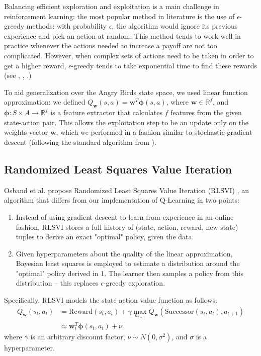 \documentclass[fleqn,10pt]{SelfArx} %
\begin{document}
Balancing efficient exploration and exploitation is a main challenge in reinforcement learning: the most popular method in literature is the use of $\epsilon$-greedy methods: with probability $\epsilon$, the algorithm would ignore its previous experience and pick an action at random. This method tends to work well in practice whenever the actions needed to increase a payoff are not too complicated. However, when complex sets of actions need to be taken in order to get a higher reward, $\epsilon$-greedy tends to take exponential time to find these rewards (see \cite{osband2014generalization}, \cite{osband2013more}, \cite{osband2015bootstrapped}.)

To aid generalization over the Angry Birds state space, we used linear function approximation: we defined $Q_\mathbf{w}(s,a)=\mathbf{w}^T \mathbf{\phi}(s,a)$, where $\mathbf{w}\in \mathbb{R}^f$, and $\mathbf{\phi}:S\times A\rightarrow \mathbb{R}^f$ is a feature extractor that calculates $f$ features from the given state-action pair. This allows the exploitation step to be an update only on the weights vector $\mathbf{w}$, which we performed in a fashion similar to stochastic gradient descent (following the standard algorithm from \cite{sutton1998reinforcement}).

\subsection{Randomized Least Squares Value Iteration}

Osband et al. propose Randomized Least Squares Value Iteration (RLSVI) \cite{osband2014generalization}, an algorithm that differs from our implementation of Q-Learning in two points:
\begin{enumerate}
\item{Instead of using gradient descent to learn from experience in an online fashion, RLSVI stores a full history of (state, action, reward, new state) tuples to derive an exact "optimal" policy, given the data.}
\item{Given hyperparameters about the quality of the linear approximation, Bayesian least squares is employed to estimate a distribution around the "optimal" policy derived in 1. The learner then samples a policy from this distribution -- this replaces $\epsilon$-greedy exploration.}
\end{enumerate}

Specifically, RLSVI models the state-action value function as follows:
\begin{equation*}
\begin{split}
Q_\mathbf{w}(s_t,a_t) &=\text{Reward}(s_t,a_t) + \gamma \max_{a_{t+1}} Q_\mathbf{w}(\text{Successor}(s_t,a_t),a_{t+1}) \\
& \approx 
\mathbf{w}_t^T \mathbf{\phi}(s_t,a_t) + \nu
\end{split}
\end{equation*}
where $\gamma$ is an arbitrary discount factor, $\nu \sim N(0,\sigma^2)$, and $\sigma$ is a hyperparameter. 
\end{document}
